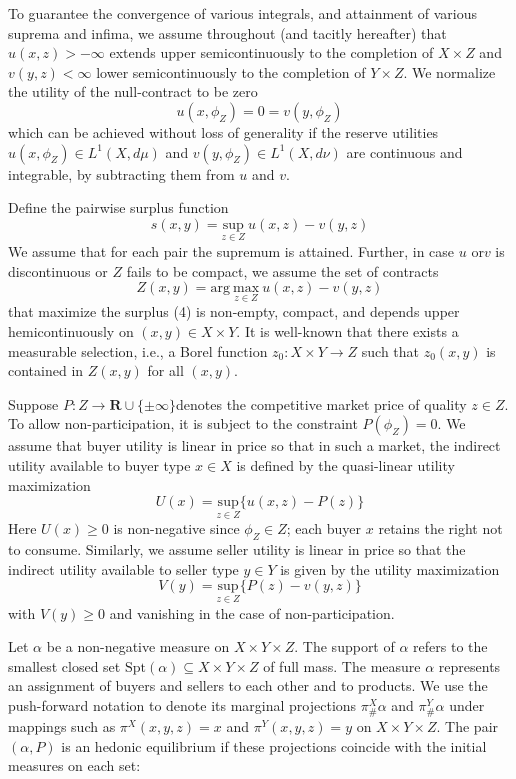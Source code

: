 \documentclass[12pt]{article}
\begin{document}
To guarantee the convergence of various integrals, and attainment of various suprema and infima, we assume throughout (and tacitly hereafter) that
$u(x,z) > -\infty$ extends upper semicontinuously to the completion of $X\times Z$ and
$v(y,z) < \infty$ lower semicontinuously to the completion of $Y \times Z$. We normalize
the utility of the null-contract to be zero
\begin{equation}
u(x,\phi_{Z}) = 0 = v(y,\phi_{Z})
\end{equation}
which can be achieved without loss of generality if the reserve utilities $u(x,\phi_{Z} ) \in L^{1} (X,d\mu)$ and $v(y,\phi_{Z} ) \in L^{1} (X,d\nu)$ are continuous and integrable, by subtracting them from $u$ and $v$.

Define the pairwise surplus function
\begin{equation}
s(x,y) = \underset{z\in Z}{\mathrm{sup}}\ u(x,z)-v(y,z)
\end{equation}
We assume that for each pair the supremum is attained. Further, in case $u$ or$
v$ is discontinuous or $Z$ fails to be compact, we assume the set of contracts
\begin{equation}
Z(x,y) = \mathrm{arg}\ \underset{z\in Z}{\mathrm{max}}\ u(x,z)-v(y,z)
\end{equation}
that maximize the surplus (4) is non-empty, compact, and depends upper hemicontinuously on $(x,y) \in X \times Y$. It is well-known that there exists a measurable selection, i.e., a Borel function $z_{0}:X \times Y \rightarrow Z$ such that $z_{0}(x,y)$ is
contained in $Z (x,y)$ for all $(x,y)$.

Suppose $P : Z \rightarrow \mathbf{R} \cup \{\pm\infty\}$denotes the competitive market price of quality
$z \in Z$. To allow non-participation, it is subject to the constraint $P (\phi_{Z}) = 0$.
We assume that buyer utility is linear in price so that in such a market, the
indirect utility available to buyer type $x \in X$ is defined by the quasi-linear
utility maximization
$$U(x)=\underset{z\in Z}{\mathrm{sup}} \{u(x,z)-P(z)\}$$
Here $U(x) \geq 0$ is non-negative since $\phi_{Z} \in Z$; each buyer $x$ retains the right
not to consume. Similarly, we assume seller utility is linear in price so that the
indirect utility available to seller type $y \in Y$ is given by the utility maximization
$$V(y)=\underset{z\in Z}{\mathrm{sup}} \{P(z)-v(y,z)\}$$
with $V (y) \geq 0$ and vanishing in the case of non-participation.

Let $\alpha$ be a non-negative measure on $X \times Y \times Z$. The support of $\alpha$ refers
to the smallest closed set $\mathrm{Spt}(\alpha) \subseteq X \times Y \times Z$ of full mass. The measure $\alpha$
represents an assignment of buyers and sellers to each other and to products.
We use the push-forward notation to denote its marginal projections $\pi^{X}_{\#}\alpha$ and $\pi^{Y}_{\#}\alpha$ under mappings such as
$\pi^{X}(x,y,z) = x $ and $\pi^{Y}(x,y,z) = y$ on $X \times Y\times Z$.
The pair $(\alpha,P)$ is an hedonic equilibrium if these projections coincide with
the initial measures on each set:
\end{document}
